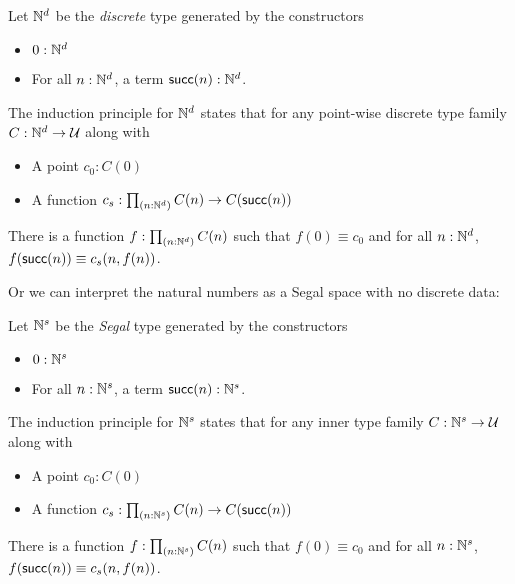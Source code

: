 \documentclass[main.tex]{subfiles}
\begin{document}
\begin{definition}
    \noindent Let $\mathbb{N}^d$ be the \textit{discrete} type generated by the constructors
\begin{itemize}
   \item $0 : \mathbb{N}^d$
   \item For all $n : \mathbb{N}^d$, a term $\mathsf{succ}(n) : \mathbb{N}^d$.
\end{itemize}
The induction principle for $\mathbb{N}^d$ states that for any point-wise discrete type family $C : \mathbb{N}^d \to \mathcal{U}$ along with
\begin{itemize}
   \item A point $c_0 : C(0)$
   \item A function $c_s : \prd{n:\Nd}C(n) \to C(\su(n))$
\end{itemize}
There is a function $f : \prd{n:\Nd}C(n)$ such that $f(0) \equiv c_0$ and for all $n : \mathbb{N}^d$, $f(\mathsf{succ}(n)) \equiv c_s(n, f(n))$.
\end{definition}
Or we can interpret the natural numbers as a Segal space with no discrete data:
\begin{definition}
    \noindent Let $\mathbb{N}^s$ be the \textit{Segal} type generated by the constructors
    \begin{itemize}
       \item $0 : \mathbb{N}^s$
       \item For all $n : \mathbb{N}^s$, a term $\mathsf{succ}(n) : \mathbb{N}^s$.
    \end{itemize}
    The induction principle for $\mathbb{N}^s$ states that for any inner type family $C : \mathbb{N}^s \to \mathcal{U}$ along with
    \begin{itemize}
       \item A point $c_0 : C(0)$
       \item A function $c_s : \prd{n:\Ns}C(n) \to C(\su(n))$
    \end{itemize}
    There is a function $f : \prd{n:\Ns}C(n)$ such that $f(0) \equiv c_0$ and for all $n : \mathbb{N}^s$, $f(\mathsf{succ}(n)) \equiv c_s(n, f(n))$.    
\end{definition}
\end{document}
